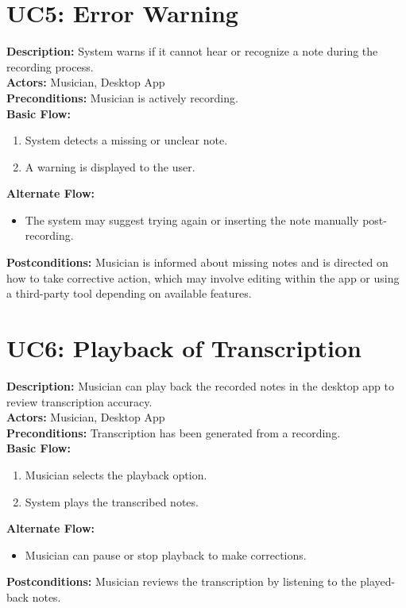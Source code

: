 \documentclass[12pt]{article}
\begin{document}
\section*{UC5: Error Warning}
\textbf{Description:} System warns if it cannot hear or recognize a note during the recording process. \\
\textbf{Actors:} Musician, Desktop App \\
\textbf{Preconditions:} Musician is actively recording. \\
\textbf{Basic Flow:}
\begin{enumerate}
    \item System detects a missing or unclear note.
    \item A warning is displayed to the user.
\end{enumerate}
\textbf{Alternate Flow:}
\begin{itemize}
    \item The system may suggest trying again or inserting the note manually post-recording.
\end{itemize}
\textbf{Postconditions:} Musician is informed about missing notes and is directed on how to take corrective action, which may involve editing within the app or using a third-party tool depending on available features.

\section*{UC6: Playback of Transcription}
\textbf{Description:} Musician can play back the recorded notes in the desktop app to review transcription accuracy. \\
\textbf{Actors:} Musician, Desktop App \\
\textbf{Preconditions:} Transcription has been generated from a recording. \\
\textbf{Basic Flow:}
\begin{enumerate}
    \item Musician selects the playback option.
    \item System plays the transcribed notes.
\end{enumerate}
\textbf{Alternate Flow:}
\begin{itemize}
    \item Musician can pause or stop playback to make corrections.
\end{itemize}
\textbf{Postconditions:} Musician reviews the transcription by listening to the played-back notes.
\end{document}

